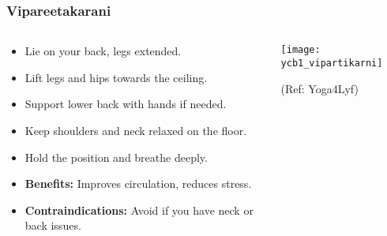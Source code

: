 \begin{frame}[fragile]\frametitle{Vipareetakarani}
\begin{columns}
    \begin{column}[T]{0.5\linewidth}
      \begin{itemize}
        \item Lie on your back, legs extended.
        \item Lift legs and hips towards the ceiling.
        \item Support lower back with hands if needed.
        \item Keep shoulders and neck relaxed on the floor.
        \item Hold the position and breathe deeply.
        \item \textbf{Benefits:} Improves circulation, reduces stress.
        \item \textbf{Contraindications:} Avoid if you have neck or back issues.
      \end{itemize}
    \end{column}
    \begin{column}[T]{0.5\linewidth}
        \begin{center}
        \begin{center}
		        \texttt{[image: ycb1\_vipartikarni]}
				
				{\tiny (Ref: Yoga4Lyf)}	        
		\end{center}   
        \end{center}    
    \end{column}
  \end{columns}
\end{frame}

